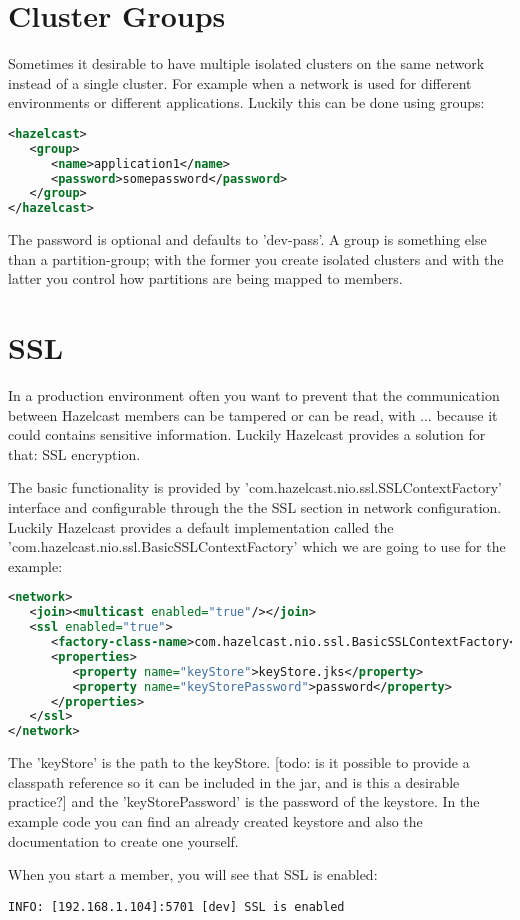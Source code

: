 \section{Cluster Groups}
Sometimes it desirable to have multiple isolated clusters on the same network instead of a single cluster. For example when a network is used for different environments or different applications. Luckily this can be done using groups:
\begin{lstlisting}[language=xml]
<hazelcast>
   <group>
      <name>application1</name>
      <password>somepassword</password>
   </group>
</hazelcast>
\end{lstlisting}
The password is optional and defaults to 'dev-pass'. A group is something else than a partition-group; with the former you create isolated clusters and with the latter you control how partitions are being mapped to members.

\section{SSL}
In a production environment often you want to prevent that the communication between Hazelcast members can be tampered or can be read, with ... because it could contains sensitive information. Luckily Hazelcast provides a solution for that: SSL encryption.

The basic functionality is provided by 'com.hazelcast.nio.ssl.SSLContextFactory' interface and configurable through the the SSL section in network configuration. Luckily Hazelcast provides a default implementation called the 'com.hazelcast.nio.ssl.BasicSSLContextFactory' which we are going to use for the example:
\begin{lstlisting}[language=xml]
<network>
   <join><multicast enabled="true"/></join>
   <ssl enabled="true">
      <factory-class-name>com.hazelcast.nio.ssl.BasicSSLContextFactory</factory-class-name>
      <properties>
         <property name="keyStore">keyStore.jks</property>
         <property name="keyStorePassword">password</property>
      </properties>
   </ssl>
</network>
\end{lstlisting}
The 'keyStore' is the path to the keyStore. [todo: is it possible to provide a classpath reference so it can be included in the jar, and is this a desirable practice?] and the 'keyStorePassword' is the password of the keystore. In the example code you can find an already created keystore and also the documentation to create one yourself.

When you start a member, you will see that SSL is enabled:
\begin{lstlisting}
INFO: [192.168.1.104]:5701 [dev] SSL is enabled
\end{lstlisting}

